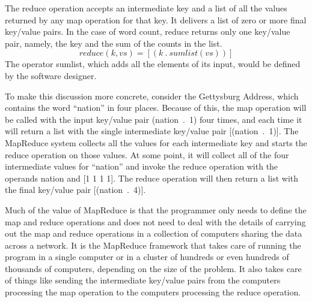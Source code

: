 The \textsf{reduce} operation accepts an intermediate key and a list of
all the values returned by any map operation for that key.
It delivers a list of zero or more final key/value pairs.
In the case of word count, reduce returns only one key/value pair,
namely, the key and the sum of the counts in the list.
\begin{displaymath}
reduce(k, vs) = [ ( k ~.~ sumlist(vs) ) ]
\end{displaymath}
The operator \textsf{sumlist}, which adds all the elements of its
input, would be defined by the software designer.

To make this discussion more concrete, consider the Gettysburg Address,
which contains the word ``nation'' in four places. Because of this,
the map operation will be called with the input key/value pair \textsf{(nation~.~1)}
four times, and each time it will return a list with
the single intermediate key/value pair \textsf{[(nation~.~1)]}. The MapReduce
system collects all the values for each intermediate key and starts the reduce
operation on those values.
At some point, it will collect all of the four intermediate
values for ``nation'' and invoke the reduce operation with the operands
\textsf{nation} and \textsf{[1 1 1 1]}.
The reduce operation will then
return a list with the final key/value pair \textsf{[(nation~.~4)]}.


Much of the value of MapReduce is that the programmer only needs to
define the map and reduce operations and
does not need to deal with the details of carrying out the map and reduce
operations in a collection of computers sharing the data across a
network.  It is the MapReduce
framework that takes care of running the program in a single
computer or in a cluster of hundreds or even hundreds of thousands
of computers, depending on the size of the problem.
It also takes care of things like
sending the intermediate key/value pairs
from the computers processing the map operation to the computers
processing the reduce operation.

